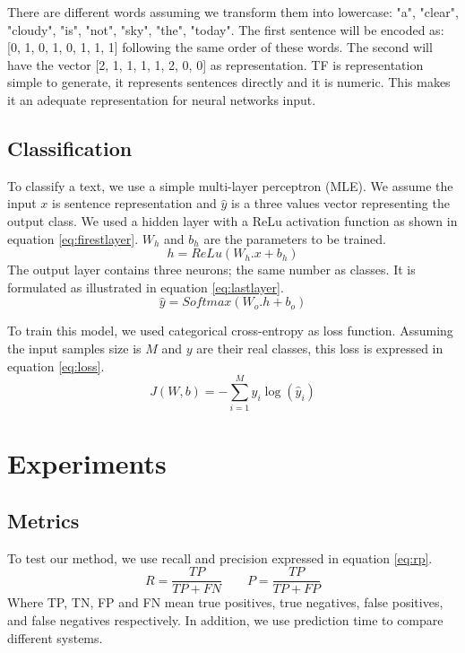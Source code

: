 \documentclass[conference]{IEEEtran}
\begin{document}
There are different words assuming we transform them into lowercase: "a", "clear", "cloudy", "is", "not", "sky", "the", "today".
The first sentence will be encoded as: [0, 1, 0, 1, 0, 1, 1, 1] following the same order of these words.
The second will have the vector [2, 1, 1, 1, 1, 2, 0, 0] as representation.
TF is representation simple to generate, it represents sentences directly and it is numeric.
This makes it an adequate representation for neural networks input.

\subsection{Classification}

To classify a text, we use a simple multi-layer perceptron (MLE). 
We assume the input $x$ is sentence representation and $\hat{y}$ is a three values vector representing the output class.
We used a hidden layer with a ReLu activation function as shown in equation \ref{eq:firestlayer}.
$W_h$ and $b_h$ are the parameters to be trained.
\begin{equation}
	h = ReLu(W_h . x + b_h)
	\label{eq:firestlayer}
\end{equation}
The output layer contains three neurons; the same number as classes.
It is formulated as illustrated in equation \ref{eq:lastlayer}.
\begin{equation}
	\hat{y} = Softmax(W_o . h + b_o)
	\label{eq:lastlayer}
\end{equation}

To train this model, we used categorical cross-entropy as loss function.
Assuming the input samples size is $M$ and $y$ are their real classes, this loss is expressed in equation \ref{eq:loss}.
\begin{equation}
	J(W, b) = - \sum\limits_{i=1}^M y_i \log(\hat{y}_i)
	\label{eq:loss}
\end{equation}

\section{Experiments}

\subsection{Metrics}

To test our method, we use recall and precision expressed in equation \ref{eq:rp}.
\begin{equation}
	R = \frac{TP}{TP + FN} \hspace{24pt} P = \frac{TP}{TP + FP}
	\label{eq:rp}
\end{equation}
Where TP, TN, FP and FN mean true positives, true negatives, false positives, and false negatives respectively.
In addition, we use prediction time to compare different systems.
\end{document}
